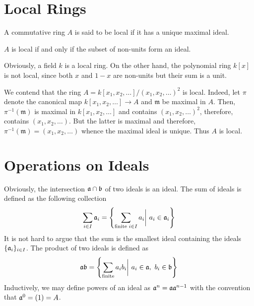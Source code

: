 \section{Local Rings}
\begin{definition}
    A commutative ring $A$ is said to be local if it has a unique maximal ideal.
\end{definition}

\begin{proposition}
    $A$ is local if and only if the subset of non-units form an ideal.
\end{proposition}

Obviously, a field $k$ is a local ring. On the other hand, the polynomial ring $k[x]$ is not local, since both $x$ and $1 - x$ are non-units but their sum is a unit. 

We contend that the ring $A = k[x_1,x_2,\ldots]/(x_1,x_2,\ldots)^2$ is local. Indeed, let $\pi$ denote the canonical map $k[x_1,x_2,\ldots]\to A$ and $\mathfrak m$ be maximal in $A$. Then, $\pi^{-1}(\mathfrak m)$ is maximal in $k[x_1,x_2,\ldots]$ and contains $(x_1,x_2,\ldots)^2$, therefore, contains $(x_1,x_2,\ldots)$. But the latter is maximal and therefore, $\pi^{-1}(\mathfrak m) = (x_1,x_2,\ldots)$ whence the maximal ideal is unique. Thus $A$ is local.


\section{Operations on Ideals}

Obviously, the intersection $\mathfrak a\cap\mathfrak b$ of two ideals is an ideal. The sum of ideals is defined as the following collection
\begin{equation*}
    \sum_{i\in I}\mathfrak a_i = \left\{\sum_{\text{finite }i\in I}a_i\bigg\vert~a_i\in\mathfrak a_i\right\}
\end{equation*}
It is not hard to argue that the sum is the smallest ideal containing the ideals $\{\mathfrak a_i\}_{i\in I}$. The product of two ideals is defined as 
\begin{equation*}
    \mathfrak a\mathfrak b = \left\{\sum_{\text{finite}}a_ib_i\bigg\vert~a_i\in\mathfrak a,~b_i\in\mathfrak b\right\}
\end{equation*}
Inductively, we may define powers of an ideal as $\mathfrak a^n = \mathfrak a\mathfrak a^{n - 1}$ with the convention that $\mathfrak a^0 = (1) = A$.

